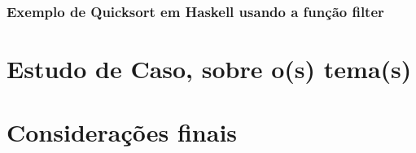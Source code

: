 \documentclass[
  article,			       %
  12pt,				         %
  oneside,			       %
  a4paper,			       %
  english,		       	 %
  brazil,			      	 %
  sumario=tradicional
]{abntex2}
\begin{document}
      

      \newpage

      \subsection{Exemplo de Quicksort em Haskell usando a função filter} 

      


    \newpage

    \chapter{Estudo de Caso, sobre o(s) tema(s)}

    \newpage

    \chapter{Considerações finais}

    \newpage
\end{document}
